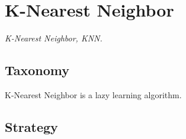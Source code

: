 
\section{K-Nearest Neighbor} 
\label{sec:knn}


\emph{K-Nearest Neighbor, KNN.}

\subsection{Taxonomy}
K-Nearest Neighbor is a lazy learning algorithm.

\subsection{Strategy}


